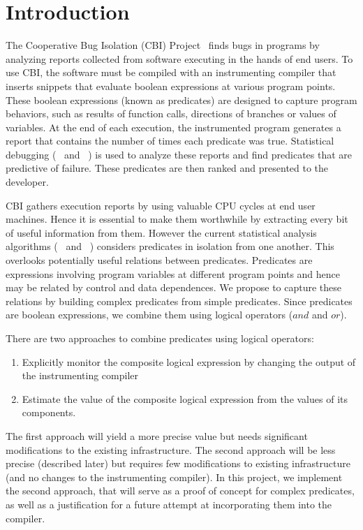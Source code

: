 \section{Introduction}

The Cooperative Bug Isolation (CBI) Project~\cite{Liblit:2004:CBI} finds bugs in programs by analyzing reports collected from software executing in the hands of end users.  To use CBI, the software must be compiled with an instrumenting compiler that inserts snippets that evaluate boolean expressions at various program points.  These boolean expressions (known as predicates) are designed to capture program behaviors, such as results of function calls, directions of branches or values of variables.  At the end of each execution, the instrumented program generates a report that contains the number of times each predicate was true.  Statistical debugging (~\cite{Liblit:2005:SSBI} and ~\cite{Zheng:2006:SDSIMB}) is used to analyze these reports and find predicates that are predictive of failure.  These predicates are then ranked and presented to the developer.

CBI gathers execution reports by using valuable CPU cycles at end user machines.  Hence it is essential to make them worthwhile by extracting every bit of useful information from them.  However the current statistical analysis algorithms (~\cite{Liblit:2005:SSBI} and ~\cite{Zheng:2006:SDSIMB}) considers predicates in isolation from one another.  This overlooks potentially useful relations between predicates.  Predicates are expressions involving program variables at different program points and hence may be related by control and data dependences.  We propose to capture these relations by building complex predicates from simple predicates.  Since predicates are boolean expressions, we combine them using logical operators ($and$ and $or$).

There are two approaches to combine predicates using logical operators:
\begin{enumerate}
\item Explicitly monitor the composite logical expression by changing the output of the instrumenting compiler
\item Estimate the value of the composite logical expression from the values of its components.
\end{enumerate}

The first approach will yield a more precise value but needs significant modifications to the existing infrastructure.  The second approach will be less precise (described later) but requires few modifications to existing infrastructure (and no changes to the instrumenting compiler).  In this project, we implement the second approach, that will serve as a proof of concept for complex predicates, as well as a justification for a future attempt at incorporating them into the compiler.


